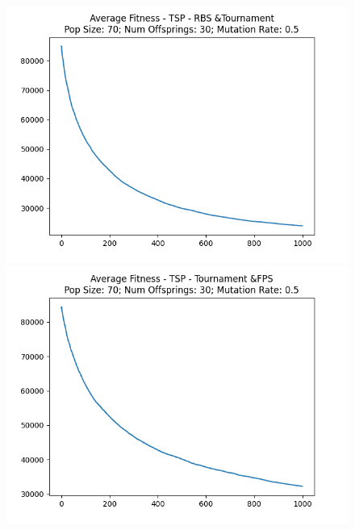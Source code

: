 \documentclass[12pt]{report}
\theoremstyle{mytheoremstyle}
\theoremstyle{mytheoremstyle}
\theoremstyle{myproblemstyle}
\begin{document}
\begin{figure}[!]
\begin{minipage}{0.4\textwidth}
		\includegraphics[width=\linewidth]{../Analysis/ASF_TSP_1_2_70_30.png}
	\end{minipage}
	\hspace{\fill}
	\begin{minipage}{0.4\textwidth}
		\includegraphics[width=\linewidth]{../Analysis/ASF_TSP_2_0_70_30.png}
	\end{minipage}
	\vspace*{1cm}
	\begin{minipage}{0.4\textwidth}

\end{minipage}
\end{figure}
\end{document}
